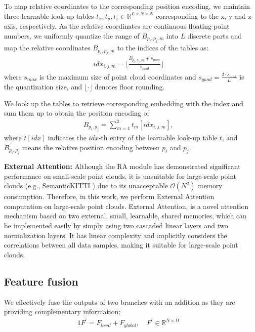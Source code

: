 \documentclass[10pt,twocolumn,letterpaper]{article}
\begin{document}
To map relative coordinates to the corresponding position encoding, we maintain three learnable look-up tables $t_x, t_y, t_z \in \mathbb{R}^{L\times N\times N}$ corresponding to the x, y and z axis, respectively. As the relative coordinates are continuous floating-point numbers, we uniformly quantize the range of $B_{p_i,p_j,m}$ into $L$ discrete parts and map the relative coordinates $B_{p_i,p_j,m}$ to the indices of the tables as:
\begin{align}
    idx_{i,j,m} = \lfloor \frac{B_{p_i,p_j,m} + s_{max}} {s_{quad}} \rfloor
\end{align}
where $s_{max}$ is the maximum size of point cloud coordinates and $s_{quad} = \frac{2\cdot s_{max}}{L}$ is the quantization size, and $\lfloor \cdot \rfloor$ denotes floor rounding.

We look up the tables to retrieve corresponding embedding with the index and sum them up to obtain the position encoding of
\begin{align}
    B_{p_i,p_j} = \sum_{m=1}^3 t_m[idx_{i,j,m}],
\end{align}
where $t[idx]$ indicates the $idx$-th entry of the learnable look-up table $t$, and $B_{p_i,p_j}$ means the relative position encoding between $p_i$ and $p_j$.

\textbf{External Attention:} 
Although the RA module has demonstrated significant performance on small-scale point clouds, it is unsuitable for large-scale point clouds (e.g., SemanticKITTI \cite{semanticKT}) due to its unacceptable $\mathcal{O}(N^2)$ memory consumption. Therefore, in this work, we perform External Attention computation on large-scale point clouds. External Attention, is a novel attention mechanism based on two external, small, learnable, shared memories, which can be implemented easily by simply using two cascaded linear layers and two normalization layers. It has linear complexity and implicitly considers the correlations between all data samples, making it suitable for large-scale point clouds. 

\subsection{Feature fusion} \label{3.3}
We effectively fuse the outputs of two branches with an addition as they are providing complementary information: 
\begin{alignat}{1}
F^{\prime} = F_{local} + F_{global},\quad
F^{\prime} \in \mathbb{R}^{N\times D}
\end{alignat}
\end{document}
